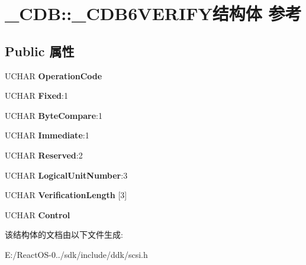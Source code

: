 \hypertarget{struct___c_d_b_1_1___c_d_b6_v_e_r_i_f_y}{}\section{\+\_\+\+C\+DB\+:\+:\+\_\+\+C\+D\+B6\+V\+E\+R\+I\+F\+Y结构体 参考}
\label{struct___c_d_b_1_1___c_d_b6_v_e_r_i_f_y}
\subsection*{Public 属性}
\begin{DoxyCompactItemize}
\item 
\mbox{\label{struct___c_d_b_1_1___c_d_b6_v_e_r_i_f_y_ad45619b4e426a01f1cb4abd5d2db770b}} 
U\+C\+H\+AR {\bfseries Operation\+Code}
\item 
\mbox{\label{struct___c_d_b_1_1___c_d_b6_v_e_r_i_f_y_a022da335f59ad51f26b395ec2548a1c8}} 
U\+C\+H\+AR {\bfseries Fixed}\+:1
\item 
\mbox{\label{struct___c_d_b_1_1___c_d_b6_v_e_r_i_f_y_ab957b061df79e700ba881ce08806590f}} 
U\+C\+H\+AR {\bfseries Byte\+Compare}\+:1
\item 
\mbox{\label{struct___c_d_b_1_1___c_d_b6_v_e_r_i_f_y_a352a9a4fcb10f723b81455f8cb800dd9}} 
U\+C\+H\+AR {\bfseries Immediate}\+:1
\item 
\mbox{\label{struct___c_d_b_1_1___c_d_b6_v_e_r_i_f_y_a850e9b739b12f3f519f62fa29e5899a7}} 
U\+C\+H\+AR {\bfseries Reserved}\+:2
\item 
\mbox{\label{struct___c_d_b_1_1___c_d_b6_v_e_r_i_f_y_a0a935c7da314fc59d15ff4b818c3a7e7}} 
U\+C\+H\+AR {\bfseries Logical\+Unit\+Number}\+:3
\item 
\mbox{\label{struct___c_d_b_1_1___c_d_b6_v_e_r_i_f_y_a8120de5680a342f119703b8bf57d8620}} 
U\+C\+H\+AR {\bfseries Verification\+Length} \mbox{[}3\mbox{]}
\item 
\mbox{\label{struct___c_d_b_1_1___c_d_b6_v_e_r_i_f_y_a42a09445ee05f7077c98281664046e16}} 
U\+C\+H\+AR {\bfseries Control}
\end{DoxyCompactItemize}


该结构体的文档由以下文件生成\+:\begin{DoxyCompactItemize}
\item 
E\+:/\+React\+O\+S-\/0../sdk/include/ddk/scsi.\+h\end{DoxyCompactItemize}
